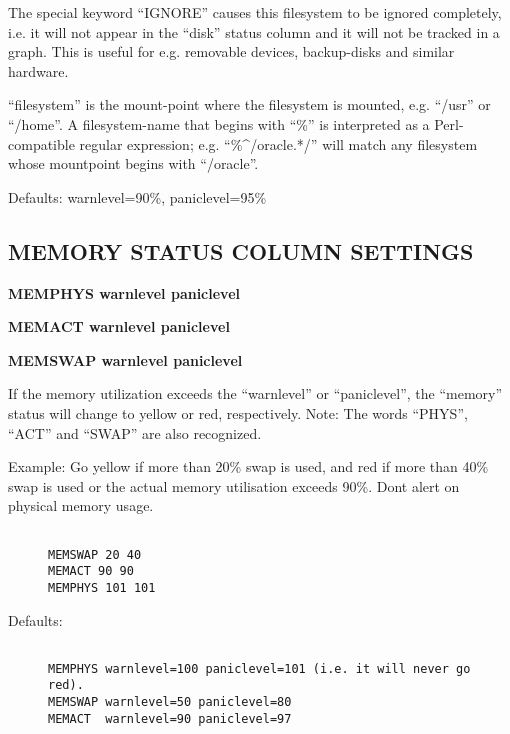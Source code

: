   The special keyword ``IGNORE'' causes this filesystem to be ignored completely, i.e. it will not appear in the ``disk'' status column and it will not be tracked in a graph. This is useful for e.g. removable devices, backup-disks and similar hardware. 


  ``filesystem'' is the mount-point where the filesystem is mounted, e.g. ``/usr'' or ``/home''. A filesystem-name that begins with ``\%'' is interpreted as a Perl-compatible regular expression; e.g. ``\%\^{}/oracle.*/'' will match any filesystem whose mountpoint begins with ``/oracle''. 


  Defaults: warnlevel=90\%, paniclevel=95\% 


 
\subsection{MEMORY STATUS COLUMN SETTINGS}


 \textbf{MEMPHYS warnlevel paniclevel}
 
\textbf{MEMACT warnlevel paniclevel}
 
\textbf{MEMSWAP warnlevel paniclevel}



  If the memory utilization exceeds the ``warnlevel'' or ``paniclevel'', the ``memory'' status will change to yellow or red, respectively. Note: The words ``PHYS'', ``ACT'' and ``SWAP'' are also recognized. 


  Example: Go yellow if more than 20\% swap is used, and red if more than 40\% swap is used or the actual memory utilisation exceeds 90\%. Dont alert on physical memory usage. \begin{description}
\item[]\begin{verbatim}

MEMSWAP 20 40
MEMACT 90 90
MEMPHYS 101 101

\end{verbatim}


\end{description}



  Defaults: \begin{description}
\item[]\begin{verbatim}

MEMPHYS warnlevel=100 paniclevel=101 (i.e. it will never go red).
MEMSWAP warnlevel=50 paniclevel=80
MEMACT  warnlevel=90 paniclevel=97

\end{verbatim}


\end{description}



